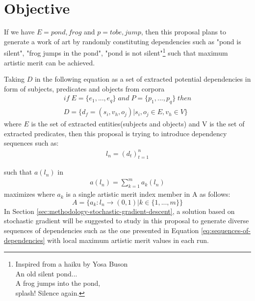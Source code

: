 \documentclass{article}
\begin{document}
	\section{Objective} \label{sec:objective}
	If we have $E={pond,frog}$ and $p={to be,jump}$, then this proposal plans to generate a work of art by randomly constituting dependencies such as "pond is silent", "frog jumps in the pond", "pond is not silent"\footnote{
		Inspired from  a haiku by Yosa Buson
		\\
		An old silent pond...
		\\
		A frog jumps into the pond,
		\\
		splash! Silence again.
	} such that maximum artistic merit can be achieved.    
	
	Taking $D$ in the following equation as a set of extracted potential dependencies in form of subjects, predicates and objects from corpora
	\begin{equation}
	\begin{split}
	if \; E=\{e_1,...,e_q\} \;and\; P=\{p_1,...,p_q\} \; then
	\\
	D = \{d_f = (s_i,v_h,o_j)|s_i,o_j \in E , v_h \in V \}
	\end{split}
	\label{eq:space-of-possible-dependencies}
	\end{equation} 
	where $E$ is the set of extracted entities(subjects and objects) and V is the set of extracted predicates,
	then this proposal is trying to introduce dependency sequences such as: 
	\begin{equation}
	\begin{split}
	l_n = (d_t)_{t=1}^{n}
	\end{split}
	\label{eq:sequences-of-dependencies}
	\end{equation} 
	
	such that $a(l_n)$ in 
	\begin{equation}
	\begin{split}
	a(l_n) =  \sum_{k=1}^{m}a_k(l_n) 
	\end{split}
	\label{eq:comprehensive-artistic-function}
	\end{equation}
	maximizes where $a_k$ is a single artistic merit index member in A as follows:
	\begin{equation}
	A=\{a_k:l_n\longrightarrow(0,1)|k\in\{1,...,m\}\}
	\label{eq:artistic-indexes}
	\end{equation}
	In Section \ref{sec:methodology-stochastic-gradient-descent}, a solution based on stochastic gradient will be suggested to study in this proposal to generate diverse sequences of dependencies such as the one presented in Equation \ref{eq:sequences-of-dependencies} with local maximum artistic merit values in each run.
\end{document}
